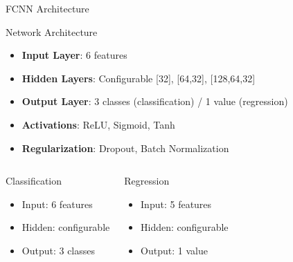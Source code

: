 \documentclass[aspectratio=169]{beamer}
\newcommand{\hlb}[1]{\textcolor{AWSBlue}{\textbf{#1}}}
\begin{document}
\begin{frame}{FCNN Architecture}
\fontsize{10}{11}\selectfont

\begin{center}
\begin{block}{Network Architecture}
\begin{itemize}
    \item \hlb{Input Layer}: 6 features
    \item \hlb{Hidden Layers}: Configurable [32], [64,32], [128,64,32]
    \item \hlb{Output Layer}: 3 classes (classification) / 1 value (regression)
    \item \hlb{Activations}: ReLU, Sigmoid, Tanh
    \item \hlb{Regularization}: Dropout, Batch Normalization
\end{itemize}
\end{block}
\end{center}

\begin{columns}
\begin{block}{Classification}
\begin{itemize}
    \item Input: 6 features
    \item Hidden: configurable
    \item Output: 3 classes
\end{itemize}
\end{block}

\begin{block}{Regression}
\begin{itemize}
    \item Input: 5 features
    \item Hidden: configurable  
    \item Output: 1 value
\end{itemize}
\end{block}
\end{columns}
\end{frame}
\end{document}
